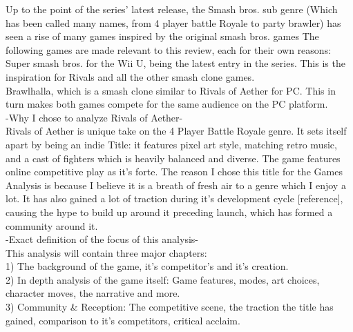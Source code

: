 \documentclass{article}
\begin{document}
Up to the point of the series' latest release, the Smash bros. sub genre (Which has been called many names, from 4 player battle Royale to party brawler) has seen a rise of many games inspired by the original smash bros. games %
The following games are made relevant to this review, each for their own reasons:\\
Super smash bros. for the Wii U, being the latest entry in the series. This is the inspiration for Rivals and all the other smash clone games.\\
Brawlhalla, which is a smash clone similar to Rivals of Aether for PC. This in turn makes both games compete for the same audience on the PC platform.\\
-Why I chose to analyze Rivals of Aether-\\
Rivals of Aether is unique take on the 4 Player Battle Royale genre. It sets itself apart by being an indie Title: it features pixel art style, matching retro music, and a cast of fighters which is heavily balanced and diverse. The game features online competitive play as it's forte. The reason I chose this title for the Games Analysis is because I believe it is a breath of fresh air to a genre which I enjoy a lot. It has also gained a lot of traction during it's development cycle [reference], causing the hype to build up around it preceding launch, which has formed a community around it.\\

-Exact definition of the focus of this analysis-\\
This analysis will contain three major chapters:\\
1) The background of the game, it's competitor's and it's creation.\\
2) In depth analysis of the game itself: Game features, modes, art choices, character moves, the narrative and more.\\
3) Community & Reception: The competitive scene, the traction the title has gained, comparison to it's competitors, critical acclaim.\\

\newpage
\end{document}
